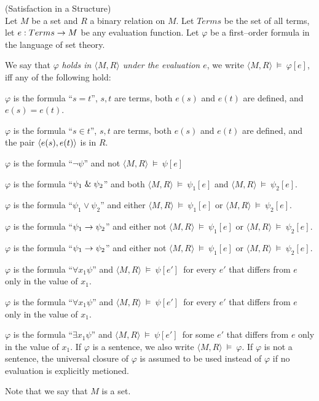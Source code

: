 \begin{definition}{(Satisfaction in a Structure)}\label{def:satisfaction}\\
Let $M$ be a set and $R$ a binary relation on $M$. Let $Terms$ be the set of all terms, let $e: Terms \rightarrow M$ be any evaluation function. Let $\varphi$  be a first–order formula in the language of set theory.

We say that $\varphi$ \emph{holds in $\langle M, R \rangle$ under the evaluation $e$}, we write $\langle M, R \rangle~\models~\varphi[e]$, iff any of the following hold:
\bce[(i)]
\item $\varphi$ is the formula ``$s = t$'', $s, t$ are terms, both $e(s)$ and $e(t)$ are defined, and $e(s) = e(t)$.
\item $\varphi$ is the formula ``$s \in t$'', $s, t$ are terms, both $e(s)$ and $e(t)$ are defined, and the pair $\langle e(s), e(t) \rangle$ is in $R$.
\item $\varphi$ is the formula ``$\neg\psi$'' and not $\langle M, R \rangle~\models~\psi[e]$
\item $\varphi$ is the formula ``$\psi_1 \mathrel{\&} \psi_2$'' and both $\langle M, R \rangle~\models~\psi_1[e]$ and $\langle M, R \rangle~\models~\psi_2[e]$.
\item $\varphi$ is the formula ``$\psi_1 \lor \psi_2$'' and either $\langle M, R \rangle~\models~\psi_1[e]$ or $\langle M, R \rangle~\models~\psi_2[e]$.
\item $\varphi$ is the formula ``$\psi_1 \rightarrow \psi_2$'' and either not $\langle M, R \rangle~\models~\psi_1[e]$ or $\langle M, R \rangle~\models~\psi_2[e]$.
\item $\varphi$ is the formula ``$\psi_1 \rightarrow \psi_2$'' and either not $\langle M, R \rangle~\models~\psi_1[e]$ or $\langle M, R \rangle~\models~\psi_2[e]$.
\item $\varphi$ is the formula ``$\forall x_1 \psi$'' and $\langle M, R \rangle~\models~\psi[e']$ for every $e'$ that differs from $e$ only in the value of $x_1$.
\item $\varphi$ is the formula ``$\forall x_1 \psi$'' and $\langle M, R \rangle~\models~\psi[e']$ for every $e'$ that differs from $e$ only in the value of $x_1$.
\item $\varphi$ is the formula ``$\exists x_1 \psi$'' and $\langle M, R \rangle~\models~\psi[e']$ for some $e'$ that differs from $e$ only in the value of $x_1$.
\ece
If $\varphi$ is a sentence, we also write $\langle M, R \rangle~\models~\varphi$. If $\varphi$ is not a sentence, 
the universal closure of $\varphi$ is assumed to be used instead of $\varphi$ if no evaluation is explicitly metioned.
\end{definition}
Note that we say that $M$ is a set. 

